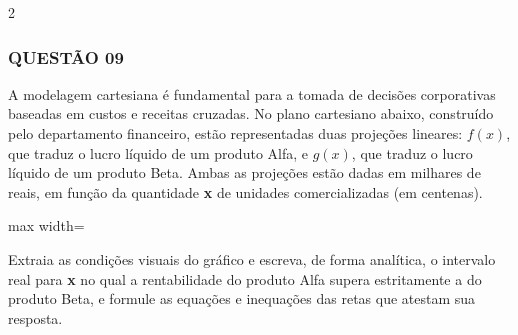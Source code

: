 \documentclass[11pt, a4paper]{article}
\begin{document}
\begin{multicols*}{2}
\subsubsection*{QUESTÃO 09}
A modelagem cartesiana é fundamental para a tomada de decisões corporativas baseadas em custos e receitas cruzadas. No plano cartesiano abaixo, construído pelo departamento financeiro, estão representadas duas projeções lineares: $ f(x) $, que traduz o lucro líquido de um produto Alfa, e $ g(x) $, que traduz o lucro líquido de um produto Beta. Ambas as projeções estão dadas em milhares de reais, em função da quantidade \textbf{x} de unidades comercializadas (em centenas).

\begin{center}
\begin{adjustbox}{max width=\linewidth}
\end{adjustbox}
\end{center}

Extraia as condições visuais do gráfico e escreva, de forma analítica, o intervalo real para \textbf{x} no qual a rentabilidade do produto Alfa supera estritamente a do produto Beta, e formule as equações e inequações das retas que atestam sua resposta.


\end{multicols*}
\end{document}

